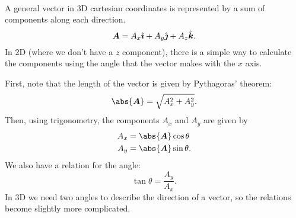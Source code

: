 \documentclass[../classical_mechanics.tex]{subfiles}
\begin{document}
        \paragraph{}
        A general vector in 3D cartesian coordinates is represented by a sum of components along each direction.
        \begin{equation}
            \boldsymbol{A}=A_x\hat{\boldsymbol{\imath}}+A_y\hat{\boldsymbol{\jmath}}+A_z\hat{\boldsymbol{k}}.
        \end{equation}
        In 2D (where we don't have a $z$ component), there is a simple way to calculate the components using the angle that the vector makes with the $x$ axis.
        \begin{figure}[H]
            \centering
        \end{figure}
        First, note that the length of the vector is given by Pythagoras' theorem:
        \begin{equation}
            \abs{\vec{A}}=\sqrt{A_x^2+A_y^2}.
        \end{equation}
        Then, using trigonometry, the components $A_x$ and $A_y$ are given by
        \begin{align}
            A_x&=\abs{\vec{A}}\cos\theta\\
            A_y&=\abs{\vec{A}}\sin\theta.
        \end{align}
        We also have a relation for the angle:
        \begin{equation}
            \tan\theta=\frac{A_y}{A_x}.
        \end{equation}
        In 3D we need two angles to describe the direction of a vector, so the relations become slightly more complicated.
\end{document}
